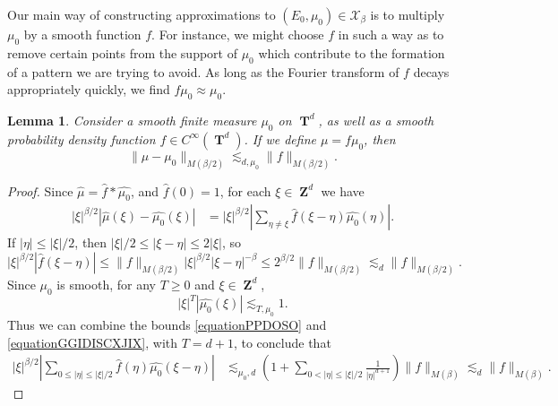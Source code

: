 \documentclass[12pt,reqno]{article}
\numberwithin{equation}{section}
\DeclareMathOperator{\ZZ}{\mathbf{Z}}
\DeclareMathOperator{\TT}{\mathbf{T}}
\newtheorem{lemma}{Lemma}
\begin{document}
Our main way of constructing approximations to $(E_0,\mu_0) \in \mathcal{X}_\beta$ is to multiply $\mu_0$ by a smooth function $f$. For instance, we might choose $f$ in such a way as to remove certain points from the support of $\mu_0$ which contribute to the formation of a pattern we are trying to avoid. As long as the Fourier transform of $f$ decays appropriately quickly, we find $f \mu_0 \approx \mu_0$.

\begin{lemma} \label{LemmaTTSICICS}
    Consider a smooth finite measure $\mu_0$ on $\TT^d$, as well as a smooth probability density function $f \in C^\infty(\TT^d)$. If we define $\mu = f \mu_0$, then
    \[ \| \mu - \mu_0 \|_{M(\beta/2)} \lesssim_{d,\mu_0} \| f \|_{M(\beta/2)}. \]
\end{lemma}
\begin{proof}
    Since $\widehat{\mu} = \widehat{f} * \widehat{\mu_0}$, and $\widehat{f}(0) = 1$, for each $\xi \in \ZZ^d$ we have
    \begin{equation} \label{equationPPYTUECUUCS}
    \begin{split}
        |\xi|^{\beta/2} |\widehat{\mu}(\xi) - \widehat{\mu_0}(\xi)| &= |\xi|^{\beta/2} \left| \sum_{\eta \neq \xi} \widehat{f}(\xi - \eta) \widehat{\mu_0}(\eta) \right|.
    \end{split}
    \end{equation}
    If $|\eta| \leq |\xi|/2$, then $|\xi|/2 \leq |\xi - \eta| \leq 2 |\xi|$, so
    \begin{equation} \label{equationPPDOSO}
        |\xi|^{\beta/2} |\widehat{f}(\xi - \eta)| \leq \| f \|_{M(\beta/2)} |\xi|^{\beta/2} |\xi-\eta|^{-\beta} \leq 2^{\beta/2} \| f \|_{M(\beta/2)} \lesssim_d \| f \|_{M(\beta/2)}.
    \end{equation}
    Since $\mu_0$ is smooth, for any $T \geq 0$ and $\xi \in \ZZ^d$,
    \begin{equation} \label{equationGGIDISCXJIX}
        |\xi|^T |\widehat{\mu_0}(\xi)| \lesssim_{T,\mu_0} 1.
    \end{equation}
    Thus we can combine the bounds \eqref{equationPPDOSO} and \eqref{equationGGIDISCXJIX}, with $T = d+1$, to conclude that
    \begin{equation} \label{equationGGPSOVVCSI}
    \begin{split}
        |\xi|^{\beta/2} \left| \sum_{0 \leq |\eta| \leq |\xi|/2} \widehat{f}(\eta) \widehat{\mu_0}(\xi - \eta) \right| &\lesssim_{\mu_0,d} \left( 1 + \sum_{0 < |\eta| \leq |\xi|/2} \frac{1}{|\eta|^{d+1}} \right) \| f \|_{M(\beta)} \lesssim_d \| f \|_{M(\beta)}.

\end{split}
\end{equation}
\end{proof}
\end{document}
